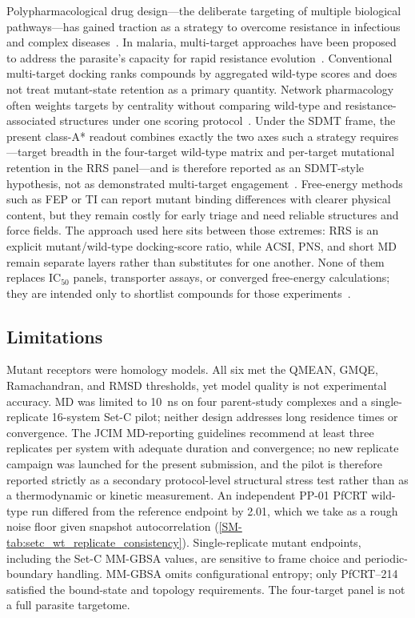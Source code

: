 \documentclass[journal=jcisd8,manuscript=article,layout=traditional]{achemso}
\begin{document}
Polypharmacological drug design---the deliberate targeting of multiple biological pathways---has gained traction as a strategy to overcome resistance in infectious and complex diseases~\citep{hegedus2025polypharmacology,rafehi2024medicinal}. In malaria, multi-target approaches have been proposed to address the parasite's capacity for rapid resistance evolution~\citep{polypharmacology_malaria_2026,multi_target_antimalarials_2025}. Conventional multi-target docking ranks compounds by aggregated wild-type scores and does not treat mutant-state retention as a primary quantity. Network pharmacology often weights targets by centrality without comparing wild-type and resistance-associated structures under one scoring protocol~\citep{Sentinel2025Offtarget,abdelhamid2025polypharmacology_ai}. Under the SDMT frame, the present class-A* readout combines exactly the two axes such a strategy requires---target breadth in the four-target wild-type matrix and per-target mutational retention in the RRS panel---and is therefore reported as an SDMT-style hypothesis, not as demonstrated multi-target engagement~\citep{sdmt2026trends}. Free-energy methods such as FEP or TI can report mutant binding differences with clearer physical content, but they remain costly for early triage and need reliable structures and force fields. The approach used here sits between those extremes: RRS is an explicit mutant/wild-type docking-score ratio, while ACSI, PNS, and short MD remain separate layers rather than substitutes for one another. None of them replaces IC$_{50}$ panels, transporter assays, or converged free-energy calculations; they are intended only to shortlist compounds for those experiments~\citep{temgoua2026quantum,multi_target_antimalarials_2025,ghosh2025pfcrt_pfdhfr}.

\subsection{Limitations}

Mutant receptors were homology models. All six met the QMEAN, GMQE, Ramachandran, and RMSD thresholds, yet model quality is not experimental accuracy. MD was limited to 10~ns on four parent-study complexes and a single-replicate 16-system Set-C pilot; neither design addresses long residence times or convergence. The JCIM MD-reporting guidelines \citep{soares2023mdreport} recommend at least three replicates per system with adequate duration and convergence; no new replicate campaign was launched for the present submission, and the pilot is therefore reported strictly as a secondary protocol-level structural stress test rather than as a thermodynamic or kinetic measurement. An independent PP-01 PfCRT wild-type run differed from the reference endpoint by \qty{2.01}{\kcalmol}, which we take as a rough noise floor given snapshot autocorrelation (\cref{SM-tab:setc_wt_replicate_consistency}). Single-replicate mutant endpoints, including the Set-C MM-GBSA values, are sensitive to frame choice and periodic-boundary handling. MM-GBSA omits configurational entropy; only PfCRT--214 satisfied the bound-state and topology requirements. The four-target panel is not a full parasite targetome.
\end{document}

